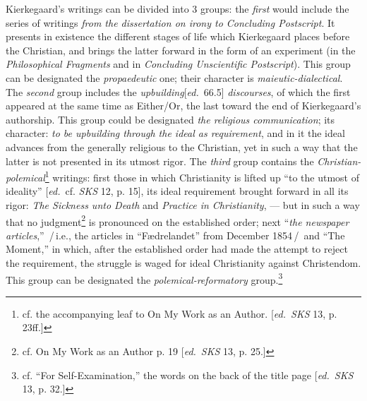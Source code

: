 \documentclass[12pt,a4paper,openany]{book}
\newcommand{\ed}[1]{{\small[\textit{ed.}\ #1]}}
\newcommand{\ins}[1]{\,/\,#1\,/\,}
\begin{document}
Kierkegaard's writings can be divided into 3 groups: the \emph{first} would
include the series of writings \emph{from the dissertation on irony to
Concluding Postscript}. It presents in existence the different stages of life
which Kierkegaard places before the Christian, and brings the latter forward in
the form of an experiment (in the \emph{Philosophical Fragments} and in
\emph{Concluding Unscientific Postscript}). This group can be designated the
\emph{propaedeutic} one; their character is \emph{maieutic-dialectical}. The
\emph{second} group includes the \emph{upbuilding}\ed{66.5} \emph{discourses}, of
which the first appeared at the same time as Either/Or, the last toward the end
of Kierkegaard's authorship. This group could be designated \emph{the religious
communication}; its character: \emph{to be upbuilding through the ideal as
requirement}, and in it the ideal advances from the generally religious to the
Christian, yet in such a way that the latter is not presented in its utmost
rigor. The \emph{third} group contains the
\emph{Christian-polemical}\footnote[32]{cf. the accompanying leaf to On My Work
as an Author. \ed{\emph{SKS} 13, p. 23ff.}} writings: first those in which
Christianity is lifted up ``to the utmost of ideality'' \ed{cf. \emph{SKS} 12,
p. 15}, its ideal requirement brought forward in all its rigor: \emph{The
Sickness unto Death} and \emph{Practice in Christianity}, --- but in such a way
that no judgment\footnote[33]{cf. On My Work as an Author p. 19 \ed{\emph{SKS}
13, p. 25.}} is pronounced on the established order; next ``\emph{the newspaper
articles},'' \ins{i.e., the articles in ``Fædrelandet'' from December 1854} and
``The Moment,'' in which, after the established order had made the attempt to
reject the requirement, the struggle is waged for ideal Christianity against
Christendom. This group can be designated the \emph{polemical-reformatory}
group.\footnote[34]{cf. ``For Self-Examination,'' the words on the back of the
title page \ed{\emph{SKS} 13, p. 32.}}
\end{document}
